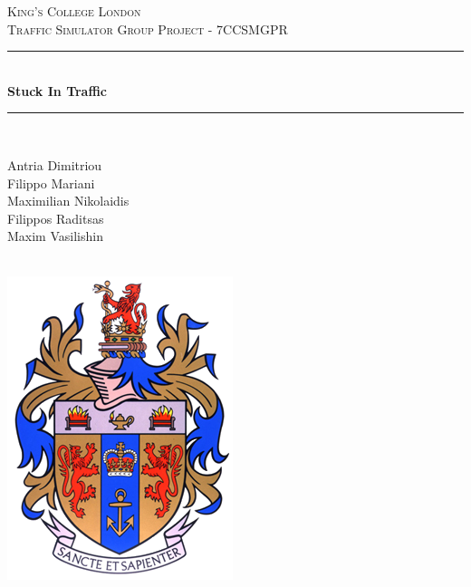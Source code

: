 \documentclass[oneside]{article}
\begin{document}
\begin{titlepage}

\newcommand{\HRule}{\rule{\linewidth}{0.5mm}}
\center
\textsc{\LARGE King's College London}\\[1.5cm]
\textsc{\Large Traffic Simulator Group Project - 7CCSMGPR}\\[0.5cm]
\HRule \\[0.4cm]
{ \huge \bfseries Stuck In Traffic}\\[0.4cm]
\HRule \\[1.5cm]

\begin{minipage}{0.4\textwidth} \large
\begin{center}
Antria Dimitriou \\
Filippo Mariani \\
Maximilian Nikolaidis \\
Filippos Raditsas \\
Maxim Vasilishin
\end{center}
\end{minipage}
\\[1cm]

\includegraphics{King's_College_London_crest}\\[1cm] 


\vfill

\end{titlepage}

\clearpage
%
\end{document}
